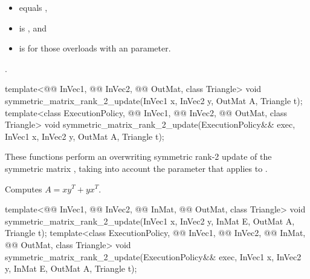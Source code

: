 \pnum
\expects
\begin{itemize}
\item
{} equals ,
\item
{} is , and
\item
{} is 
for those overloads with an  parameter.
\end{itemize}

\pnum
\complexity
{}.

%
\begin{itemdecl}
template<@@ InVec1, @@ InVec2,
         @@ OutMat, class Triangle>
  void symmetric_matrix_rank_2_update(InVec1 x, InVec2 y, OutMat A, Triangle t);
template<class ExecutionPolicy, @@ InVec1, @@ InVec2,
         @@ OutMat, class Triangle>
  void symmetric_matrix_rank_2_update(ExecutionPolicy&& exec,
                                      InVec1 x, InVec2 y, OutMat A, Triangle t);
\end{itemdecl}

\begin{itemdescr}
\pnum
These functions perform
an overwriting symmetric rank-2 update of the symmetric matrix ,
taking into account the  parameter
that applies to .

\pnum
\effects
Computes $A = x y^T + y x^T$.
\end{itemdescr}

%
\begin{itemdecl}
template<@@ InVec1, @@ InVec2, @@ InMat,
         @@ OutMat, class Triangle>
  void symmetric_matrix_rank_2_update(InVec1 x, InVec2 y, InMat E, OutMat A, Triangle t);
template<class ExecutionPolicy, @@ InVec1, @@ InVec2, @@ InMat,
         @@ OutMat, class Triangle>
  void symmetric_matrix_rank_2_update(ExecutionPolicy&& exec,
                                      InVec1 x, InVec2 y, InMat E, OutMat A, Triangle t);
\end{itemdecl}

